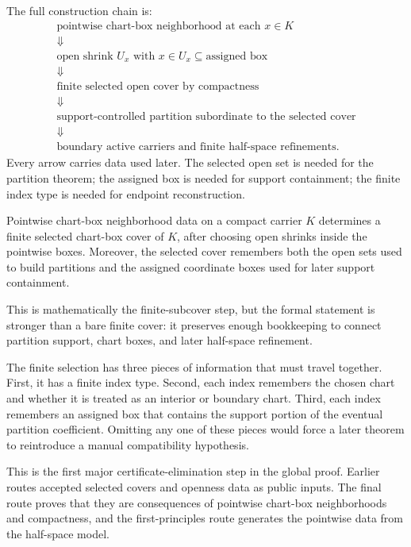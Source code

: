 The full construction chain is:
\[
\begin{array}{c}
\text{pointwise chart-box neighborhood at each }x\in K\\
\Downarrow\\
\text{open shrink }U_x\text{ with }x\in U_x\subseteq\text{assigned box}\\
\Downarrow\\
\text{finite selected open cover by compactness}\\
\Downarrow\\
\text{support-controlled partition subordinate to the selected cover}\\
\Downarrow\\
\text{boundary active carriers and finite half-space refinements}.
\end{array}
\]
Every arrow carries data used later.  The selected open set is needed for the
partition theorem; the assigned box is needed for support containment; the
finite index type is needed for endpoint reconstruction.

\begin{lemma}
\label{lem:compact-finite-selection}
Pointwise chart-box neighborhood data on a compact carrier \(K\) determines a
finite selected chart-box cover of \(K\), after choosing open shrinks inside
the pointwise boxes.  Moreover, the selected cover remembers both the open
sets used to build partitions and the assigned coordinate boxes used for later
support containment.
\end{lemma}

This is mathematically the finite-subcover step, but the formal statement is
stronger than a bare finite cover: it preserves enough bookkeeping to connect
partition support, chart boxes, and later half-space refinement.

The finite selection has three pieces of information that must travel
together.  First, it has a finite index type.  Second, each index remembers the
chosen chart and whether it is treated as an interior or boundary chart.  Third,
each index remembers an assigned box that contains the support portion of the
eventual partition coefficient.  Omitting any one of these pieces would force a
later theorem to reintroduce a manual compatibility hypothesis.

This is the first major certificate-elimination step in the global proof.
Earlier routes accepted selected covers and openness data as public inputs.
The final route proves that they are consequences of pointwise chart-box
neighborhoods and compactness, and the first-principles route generates the
pointwise data from the half-space model.


